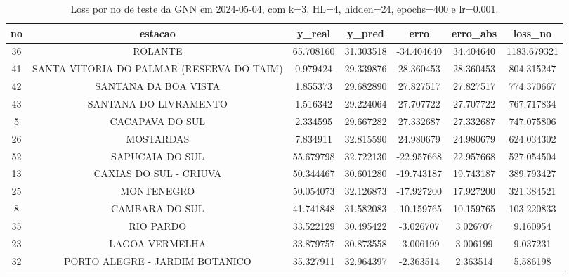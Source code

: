 \begin{table}[h]
\centering
\caption{Loss por no de teste da GNN em 2024-05-04, com k=3, HL=4, hidden=24, epochs=400 e lr=0.001.}
\label{tab:gnn_loss_k3_hl4_h24_e400_d20240504}
\begin{tabular}{ccccccc}
\toprule
no & estacao & y\_real & y\_pred & erro & erro\_abs & loss\_no \\
\midrule
36 & ROLANTE & 65.708160 & 31.303518 & -34.404640 & 34.404640 & 1183.679321 \\
41 & SANTA VITORIA DO PALMAR (RESERVA DO TAIM) & 0.979424 & 29.339876 & 28.360453 & 28.360453 & 804.315247 \\
42 & SANTANA DA BOA VISTA & 1.855373 & 29.682890 & 27.827517 & 27.827517 & 774.370667 \\
43 & SANTANA DO LIVRAMENTO & 1.516342 & 29.224064 & 27.707722 & 27.707722 & 767.717834 \\
5 & CACAPAVA DO SUL & 2.334595 & 29.667282 & 27.332687 & 27.332687 & 747.075806 \\
26 & MOSTARDAS & 7.834911 & 32.815590 & 24.980679 & 24.980679 & 624.034302 \\
52 & SAPUCAIA DO SUL & 55.679798 & 32.722130 & -22.957668 & 22.957668 & 527.054504 \\
13 & CAXIAS DO SUL - CRIUVA & 50.344467 & 30.601280 & -19.743187 & 19.743187 & 389.793427 \\
25 & MONTENEGRO & 50.054073 & 32.126873 & -17.927200 & 17.927200 & 321.384521 \\
8 & CAMBARA DO SUL & 41.741848 & 31.582083 & -10.159765 & 10.159765 & 103.220833 \\
35 & RIO PARDO & 33.522129 & 30.495422 & -3.026707 & 3.026707 & 9.160954 \\
23 & LAGOA VERMELHA & 33.879757 & 30.873558 & -3.006199 & 3.006199 & 9.037231 \\
32 & PORTO ALEGRE - JARDIM BOTANICO & 35.327911 & 32.964397 & -2.363514 & 2.363514 & 5.586198 \\
\bottomrule
\end{tabular}
\end{table}
